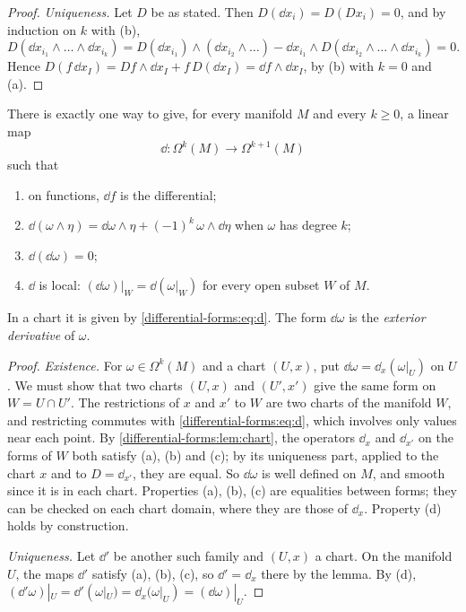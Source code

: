 \begin{notechapter}
\begin{proof}
\emph{Uniqueness.} Let $D$ be as stated. Then $D(\dd x_i) = D(Dx_i) = 0$,
and by induction on $k$ with (b),
\[
  D(\dd x_{i_1}\wedge\dots\wedge\dd x_{i_k})
  = D(\dd x_{i_1})\wedge(\dd x_{i_2}\wedge\dots)
  - \dd x_{i_1}\wedge D(\dd x_{i_2}\wedge\dots\wedge\dd x_{i_k}) = 0 .
\]
Hence $D(f\,\dd x_I) = Df\wedge\dd x_I + f\,D(\dd x_I)
= \dd f\wedge\dd x_I$, by (b) with $k = 0$ and (a).
\end{proof}

\begin{theorem}\label{differential-forms:thm:d}
There is exactly one way to give, for every manifold $M$ and every
$k\geq0$, a linear map
\[
  \dd:\Omega^k(M)\to\Omega^{k+1}(M)
\]
such that
\begin{enumerate}[nosep,label=(\alph*)]
  \item on functions, $\dd f$ is the differential;
  \item $\dd(\omega\wedge\eta)
        = \dd\omega\wedge\eta + (-1)^k\,\omega\wedge\dd\eta$ when
        $\omega$ has degree $k$;
  \item $\dd(\dd\omega) = 0$;
  \item $\dd$ is local: $(\dd\omega)|_W = \dd(\omega|_W)$ for every open
        subset $W$ of $M$.
\end{enumerate}
In a chart it is given by \eqref{differential-forms:eq:d}. The form
$\dd\omega$ is the \emph{exterior derivative} of $\omega$.
\end{theorem}

\begin{proof}
\emph{Existence.} For $\omega\in\Omega^k(M)$ and a chart $(U, x)$, put
$\dd\omega = \dd_x(\omega|_U)$ on $U$. We must show that two charts
$(U, x)$ and $(U', x')$ give the same form on $W = U\cap U'$. The
restrictions of $x$ and $x'$ to $W$ are two charts of the manifold $W$,
and restricting commutes with \eqref{differential-forms:eq:d}, which
involves only values near each point. By
\cref{differential-forms:lem:chart}, the operators $\dd_x$ and
$\dd_{x'}$ on the forms of $W$ both satisfy (a), (b) and (c); by its
uniqueness part, applied to the chart $x$ and to $D = \dd_{x'}$, they
are equal. So $\dd\omega$ is well defined on $M$, and smooth since it is
in each chart. Properties (a), (b), (c) are equalities between forms;
they can be checked on each chart domain, where they are those of
$\dd_x$. Property (d) holds by construction.

\emph{Uniqueness.} Let $\dd'$ be another such family and $(U, x)$ a
chart. On the manifold $U$, the maps $\dd'$ satisfy (a), (b), (c), so
$\dd' = \dd_x$ there by the lemma. By (d),
$(\dd'\omega)|_U = \dd'(\omega|_U) = \dd_x(\omega|_U)
= (\dd\omega)|_U$.
\end{proof}


\end{notechapter}

